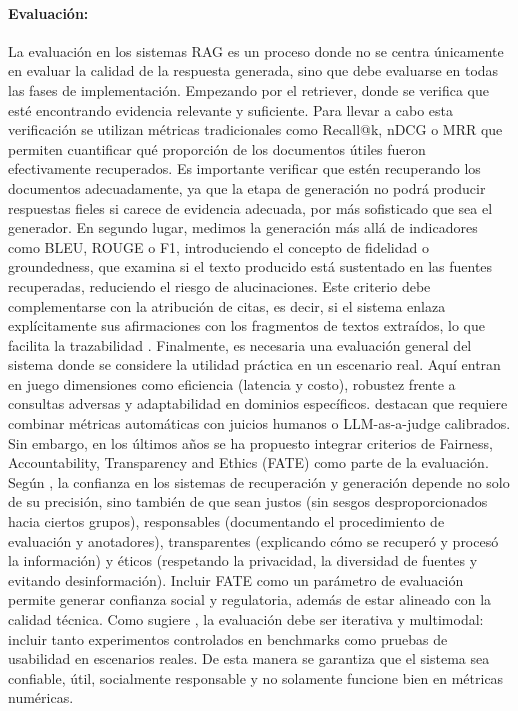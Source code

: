 \paragraph{Evaluación:} 
La evaluación en los sistemas RAG es un proceso donde no se centra únicamente en evaluar la calidad de la respuesta generada, sino que debe evaluarse en todas las fases de implementación. 
Empezando por el retriever, donde se verifica que esté encontrando evidencia relevante y suficiente. Para llevar a cabo esta verificación se utilizan métricas tradicionales como Recall@k, nDCG o MRR que permiten  
cuantificar qué proporción de los documentos útiles fueron efectivamente recuperados. Es importante verificar que estén recuperando los documentos adecuadamente, ya que la etapa de generación no podrá producir respuestas fieles si carece de evidencia adecuada, por más sofisticado que sea el generador.  
En segundo lugar, medimos la generación más allá de indicadores como BLEU, ROUGE o F1, introduciendo el concepto de fidelidad o groundedness, que examina si el texto producido está sustentado en las fuentes recuperadas, reduciendo el riesgo de alucinaciones. 
Este criterio debe complementarse con la atribución de citas, es decir, si el sistema enlaza explícitamente sus afirmaciones con los fragmentos de textos extraídos, lo que facilita la trazabilidad \parencite{zhang2025hallucination}.  
Finalmente, es necesaria una evaluación general del sistema donde se considere la utilidad práctica en un escenario real. Aquí entran en juego dimensiones como eficiencia (latencia y costo), robustez frente a consultas adversas y adaptabilidad en dominios específicos. \textcite{knollmeyer2024benchmarking} destacan que requiere combinar métricas automáticas con juicios humanos o LLM-as-a-judge calibrados.  
Sin embargo, en los últimos años se ha propuesto integrar criterios de Fairness, Accountability, Transparency and Ethics (FATE) como parte de la evaluación. Según \textcite{bernard2025fate}, la confianza en los sistemas de recuperación y generación depende no solo de su precisión, sino también de que sean justos (sin sesgos desproporcionados hacia ciertos grupos), responsables (documentando el procedimiento 
de evaluación y anotadores), transparentes (explicando cómo se recuperó y procesó la información) y éticos (respetando la privacidad, la diversidad de fuentes y evitando desinformación).  
Incluir FATE como un parámetro de evaluación permite generar confianza social y regulatoria, además de estar alineado con la calidad técnica. Como sugiere \textcite{ramdurai2025llm}, la evaluación debe ser iterativa y multimodal: incluir tanto experimentos controlados en benchmarks como pruebas de usabilidad en escenarios reales. De esta manera se garantiza que el sistema sea confiable, útil, socialmente responsable y no solamente funcione bien en métricas numéricas.  


